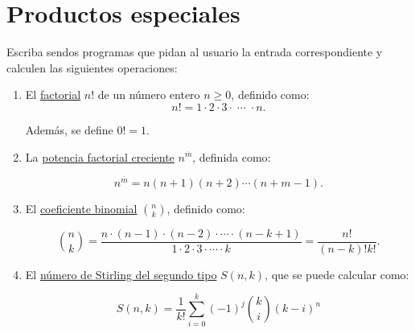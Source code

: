 \section{Productos especiales}

Escriba sendos programas que pidan al usuario la entrada correspondiente
y calculen las siguientes operaciones:

\begin{enumerate}
\item
  El \href{http://mathworld.wolfram.com/Factorial.html}{factorial} \(n!\)
  de un número entero \(n \ge 0\), definido como:
  \[n! = 1\cdot 2\cdot 3\cdot\;\cdots\;\cdot n.\]

  Además, se define \(0! = 1\).
\item
  La \href{http://mathworld.wolfram.com/RisingFactorial.html}{potencia
  factorial creciente} \(n^{\overline{m}}\), definida como:

  \[n^{\overline{m}} = n (n + 1) (n + 2) \cdots (n + m - 1).\]
\item
  El
  \href{http://mathworld.wolfram.com/BinomialCoefficient.html}{coeficiente
  binomial} \(\binom{n}{k}\), definido como:

  \[{n\choose k} =
  \frac{n\cdot (n-1)\cdot (n-2)\cdot \cdots \cdot (n-k+1)}
  {1\cdot 2\cdot 3\cdot \cdots \cdot k} =
  \frac{n!}{(n - k)! k!}.\]
\item
  El
  \href{http://mathworld.wolfram.com/StirlingNumberoftheSecondKind.html}{número
  de Stirling del segundo tipo} \(S(n, k)\), que se puede calcular como:

  \[S(n, k) = \frac{1}{k!}
  \sum_{i=0}^{k} (-1)^j {k\choose i} (k - i)^n\]
\end{enumerate}
